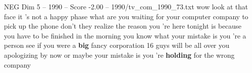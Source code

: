 \begin{textsample}{NEG Dim 5 – 1990 – Score -2.00 – 1990/tv\_com\_1990\_73.txt}  \label{ex:f5_neg_072}
wow look at that face it 's not a happy phase what are you waiting for your computer company to pick up the phone don't they realize the reason you 're here tonight is because you have to be finished in the morning you know what your mistake is you 're a person see if you were a \textbf{big} fancy corporation 16 guys will be all over you apologizing by now or maybe your mistake is you 're \textbf{holding} for the wrong company

\end{textsample}
